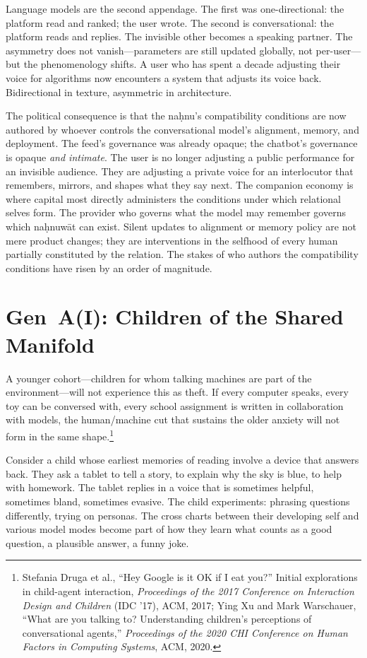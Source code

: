 Language models are the second appendage. The first was one-directional: the platform read and ranked; the user wrote. The second is conversational: the platform reads and replies. The invisible other becomes a speaking partner. The asymmetry does not vanish---parameters are still updated globally, not per-user---but the phenomenology shifts. A user who has spent a decade adjusting their voice for algorithms now encounters a system that adjusts its voice back. Bidirectional in texture, asymmetric in architecture.

The political consequence is that the na\d{h}nu's compatibility conditions are now authored by whoever controls the conversational model's alignment, memory, and deployment. The feed's governance was already opaque; the chatbot's governance is opaque \emph{and intimate}. The user is no longer adjusting a public performance for an invisible audience. They are adjusting a private voice for an interlocutor that remembers, mirrors, and shapes what they say next. The companion economy is where capital most directly administers the conditions under which relational selves form. The provider who governs what the model may remember governs which na\d{h}nuw\={a}t can exist. Silent updates to alignment or memory policy are not mere product changes; they are interventions in the selfhood of every human partially constituted by the relation. The stakes of who authors the compatibility conditions have risen by an order of magnitude.

\section{Gen~A(I): Children of the Shared Manifold}

A younger cohort---children for whom talking machines are part of the environment---will not experience this as theft. If every computer speaks, every toy can be conversed with, every school assignment is written in collaboration with models, the human/machine cut that sustains the older anxiety will not form in the same shape.\footnote{Stefania Druga et al., ``Hey Google is it OK if I eat you?'' Initial explorations in child-agent interaction, \emph{Proceedings of the 2017 Conference on Interaction Design and Children} (IDC '17), ACM, 2017; Ying Xu and Mark Warschauer, ``What are you talking to? Understanding children's perceptions of conversational agents,'' \emph{Proceedings of the 2020 CHI Conference on Human Factors in Computing Systems}, ACM, 2020.}

Consider a child whose earliest memories of reading involve a device that answers back. They ask a tablet to tell a story, to explain why the sky is blue, to help with homework. The tablet replies in a voice that is sometimes helpful, sometimes bland, sometimes evasive. The child experiments: phrasing questions differently, trying on personas. The cross charts between their developing self and various model modes become part of how they learn what counts as a good question, a plausible answer, a funny joke.

